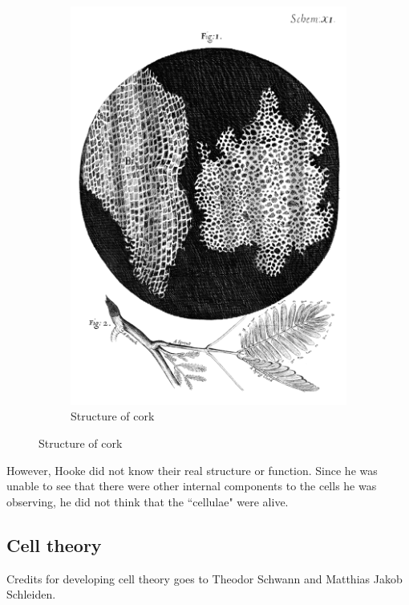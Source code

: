 \documentclass[12pt, a4paper, titlepage]{article}
\begin{document}
\begin{figure}[H]
\begin{subfigure}{0.45\textwidth}
        \includegraphics[scale=0.15]{img/hooke-draw.png}
        \caption{Structure of cork}
    \end{subfigure}
\end{figure}

However, Hooke did not know their real structure or function. Since he was unable to see that there were other internal components to the cells he was observing, he did not think that the ``cellulae" were alive.\supercite{gest2004}

\subsection{Cell theory}
Credits for developing cell theory goes to Theodor Schwann and Matthias Jakob Schleiden.\supercite{sharp1921}



\newpage
\printbibliography
\end{document}
